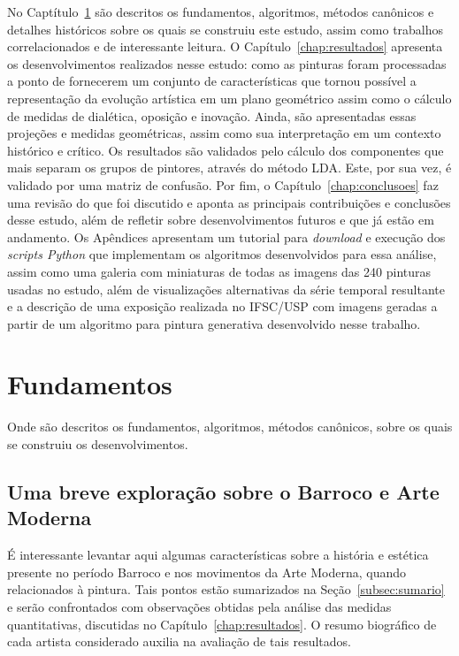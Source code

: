 No Captítulo~\ref{cap:fundamentos} são descritos os fundamentos,
algoritmos, métodos canônicos e detalhes históricos sobre os quais se
construiu este estudo, assim como trabalhos correlacionados e de
interessante leitura. O Capítulo~\ref{chap:resultados} apresenta os
desenvolvimentos realizados nesse estudo: como as pinturas foram
processadas a ponto de fornecerem um conjunto de características que
tornou possível a representação da evolução artística em um plano
geométrico assim como o cálculo de medidas de dialética, oposição e
inovação. Ainda, são apresentadas essas projeções e medidas
geométricas, assim como sua interpretação em um contexto histórico e
crítico. Os resultados são validados pelo cálculo dos componentes que
mais separam os grupos de pintores, através do método LDA. Este, por
sua vez, é validado por uma matriz de confusão. Por fim, o
Capítulo~\ref{chap:conclusoes} faz uma revisão do que foi discutido e
aponta as principais contribuições e conclusões desse estudo, além de
refletir sobre desenvolvimentos futuros e que já estão em
andamento. Os Apêndices apresentam um tutorial para \textit{download}
e execução dos \textit{scripts Python} que implementam os algoritmos
desenvolvidos para essa análise, assim como uma galeria com miniaturas
de todas as imagens das 240 pinturas usadas no estudo, além de
visualizações alternativas da série temporal resultante e a descrição
de uma exposição realizada no IFSC/USP com imagens geradas a partir de
um algoritmo para pintura generativa desenvolvido nesse trabalho.


\chapter{Fundamentos}
\label{cap:fundamentos}

Onde são descritos os fundamentos, algoritmos, métodos canônicos,
sobre os quais se construiu os desenvolvimentos.

\section{Uma breve exploração sobre o Barroco e Arte Moderna}
\label{sec:breve}

É interessante levantar aqui algumas características sobre a história
e estética presente no período Barroco e nos movimentos da Arte
Moderna, quando relacionados à pintura. Tais pontos estão sumarizados
na Seção~\ref{subsec:sumario} e serão confrontados com observações
obtidas pela análise das medidas quantitativas, discutidas no
Capítulo~\ref{chap:resultados}. O resumo biográfico de cada artista
considerado auxilia na avaliação de tais resultados.


